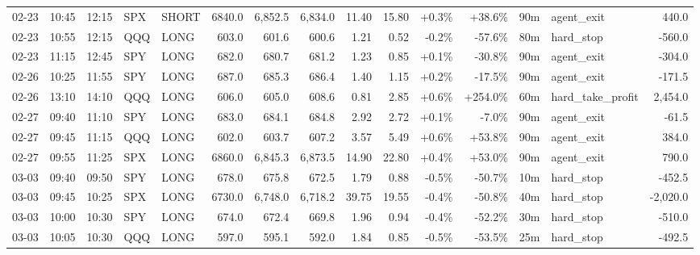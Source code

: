 \documentclass[11pt,a4paper,twoside]{article}
\begin{document}
\begin{landscape}
\begin{center}
\begin{longtable}{>{\color{txtmain}}l l l l l r r r r r r r r >{\color{txtmain}}l r}
02-23 & 10:45 & 12:15 & SPX & SHORT & 6840.0 & 6,852.5 & 6,834.0 & 11.40 & 15.80 & \textcolor{wingreen}{+0.3\%} & \textcolor{wingreen}{+38.6\%} & 90m & agent\_exit & \textcolor{wingreen}{440.0} \\
02-23 & 10:55 & 12:15 & QQQ & LONG & 603.0 & 601.6 & 600.6 & 1.21 & 0.52 & \textcolor{lossred}{-0.2\%} & \textcolor{lossred}{-57.6\%} & 80m & hard\_stop & \textcolor{lossred}{-560.0} \\
02-23 & 11:15 & 12:45 & SPY & LONG & 682.0 & 680.7 & 681.2 & 1.23 & 0.85 & \textcolor{wingreen}{+0.1\%} & \textcolor{lossred}{-30.8\%} & 90m & agent\_exit & \textcolor{lossred}{-304.0} \\
02-26 & 10:25 & 11:55 & SPY & LONG & 687.0 & 685.3 & 686.4 & 1.40 & 1.15 & \textcolor{wingreen}{+0.2\%} & \textcolor{lossred}{-17.5\%} & 90m & agent\_exit & \textcolor{lossred}{-171.5} \\
02-26 & 13:10 & 14:10 & QQQ & LONG & 606.0 & 605.0 & 608.6 & 0.81 & 2.85 & \textcolor{wingreen}{+0.6\%} & \textcolor{wingreen}{+254.0\%} & 60m & hard\_take\_profit & \textcolor{wingreen}{2,454.0} \\
02-27 & 09:40 & 11:10 & SPY & LONG & 683.0 & 684.1 & 684.8 & 2.92 & 2.72 & \textcolor{wingreen}{+0.1\%} & \textcolor{lossred}{-7.0\%} & 90m & agent\_exit & \textcolor{lossred}{-61.5} \\
02-27 & 09:45 & 11:15 & QQQ & LONG & 602.0 & 603.7 & 607.2 & 3.57 & 5.49 & \textcolor{wingreen}{+0.6\%} & \textcolor{wingreen}{+53.8\%} & 90m & agent\_exit & \textcolor{wingreen}{384.0} \\
02-27 & 09:55 & 11:25 & SPX & LONG & 6860.0 & 6,845.3 & 6,873.5 & 14.90 & 22.80 & \textcolor{wingreen}{+0.4\%} & \textcolor{wingreen}{+53.0\%} & 90m & agent\_exit & \textcolor{wingreen}{790.0} \\
03-03 & 09:40 & 09:50 & SPY & LONG & 678.0 & 675.8 & 672.5 & 1.79 & 0.88 & \textcolor{lossred}{-0.5\%} & \textcolor{lossred}{-50.7\%} & 10m & hard\_stop & \textcolor{lossred}{-452.5} \\
03-03 & 09:45 & 10:25 & SPX & LONG & 6730.0 & 6,748.0 & 6,718.2 & 39.75 & 19.55 & \textcolor{lossred}{-0.4\%} & \textcolor{lossred}{-50.8\%} & 40m & hard\_stop & \textcolor{lossred}{-2,020.0} \\
03-03 & 10:00 & 10:30 & SPY & LONG & 674.0 & 672.4 & 669.8 & 1.96 & 0.94 & \textcolor{lossred}{-0.4\%} & \textcolor{lossred}{-52.2\%} & 30m & hard\_stop & \textcolor{lossred}{-510.0} \\
03-03 & 10:05 & 10:30 & QQQ & LONG & 597.0 & 595.1 & 592.0 & 1.84 & 0.85 & \textcolor{lossred}{-0.5\%} & \textcolor{lossred}{-53.5\%} & 25m & hard\_stop & \textcolor{lossred}{-492.5} \\

\end{longtable}
\end{center}
\end{landscape}
\end{document}
